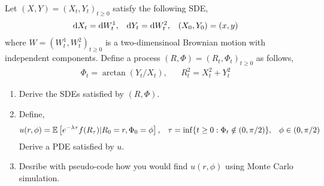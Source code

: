 \begin{problem}
    Let \( (X,Y) = (X_t,Y_t)_{t\geq 0} \) satisfy the following SDE,
    \begin{align*}
        \mathrm{d} X_t = \mathrm{d} W_t^1, && \mathrm{d} Y_t = \mathrm{d} W_t^2, && (X_0,Y_0) = (x,y)
    \end{align*}
    where \( W = (W_t^1,W_t^2)_{t\geq 0} \) is a two-dimensinoal Brownian motion with independent components. Define a process \( (R,\Phi) = (R_t,\Phi_t)_{t\geq 0} \) as follows,
    \begin{align*}
        \Phi_t = \arctan(Y_t/X_t), && R_t^2 = X_t^2 + Y_t^2
    \end{align*}
    \begin{enumerate}[nolistsep,label=(\alph*)]
        \item Derive the SDEs satisfied by \( (R,\Phi) \).
        \item Define,
            \begin{align*}
                u(r,\phi) = \mathbb{E} \left[ e^{-\lambda \tau} f(R_\tau) | R_0 = r,\Phi_0 = \phi \right], &&
                \tau = \inf\{t\geq 0:\Phi_t\notin(0,\pi/2)\}, &&
                \phi \in (0,\pi/2)
            \end{align*}
            Derive a PDE satisfied by \( u \).
        \item Desribe with pseudo-code how you would find \( u(r,\phi) \) using Monte Carlo simulation.
    \end{enumerate}    
\end{problem}

